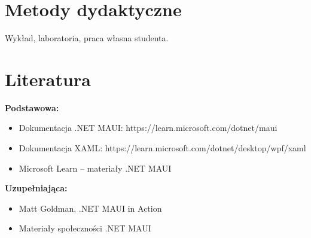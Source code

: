 \documentclass[12pt, a4paper]{article}
\begin{document}
\section{Metody dydaktyczne}

Wykład, laboratoria, praca własna studenta.

\section{Literatura}

\textbf{Podstawowa:}
\begin{itemize}
  \item Dokumentacja .NET MAUI: https://learn.microsoft.com/dotnet/maui
  \item Dokumentacja XAML: https://learn.microsoft.com/dotnet/desktop/wpf/xaml
  \item Microsoft Learn – materiały .NET MAUI
\end{itemize}

\textbf{Uzupełniająca:}
\begin{itemize}
  \item Matt Goldman, .NET MAUI in Action
  \item Materiały społeczności .NET MAUI
\end{itemize}
\end{document}
